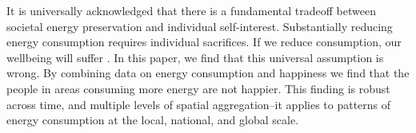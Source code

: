 \documentclass[10pt, letterpaper]{article}
\begin{document}
\begin{spacing}{1.4}
It is universally acknowledged that there is a fundamental tradeoff between
societal energy preservation and individual self-interest. Substantially reducing
energy consumption requires individual sacrifices. If we reduce consumption, our
wellbeing will 
suffer \cite{gordon_wsj_may_29_14, dietz15, carter_pbs_apr_18_77,smil05}. %
%
%
%
%
%
In this paper, we find that this universal assumption is wrong.  By combining
data on energy consumption and happiness we find that the
 people in areas consuming more energy are not happier.
This finding is robust across time, and multiple levels of spatial aggregation--it applies to patterns of energy consumption  at the local, national, and global scale.  



\end{spacing}
\end{document}
